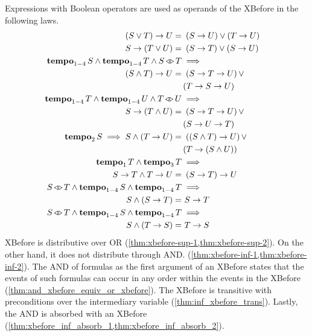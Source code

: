 Expressions with Boolean operators are used as operands of the \ac{XBefore} in the following laws.
%
\begin{subequations}
\label{thms:xbefore-boolean}
\begin{align}
\xbefore{\left(S \lor T\right)}{U} =&~
  \parsin{\xbefore{S}{U}} \lor \parsin{\xbefore{T}{U}} &
  \label{thm:xbefore-sup-1}\\
\xbefore{S}{\left(T \lor U\right)} =&~
  \parsin{\xbefore{S}{T}} \lor \parsin{\xbefore{S}{U}} &
  \label{thm:xbefore-sup-2}\\
\tempo{S} \land \tempo{T} \land \independentevents{S}{T} & \implies\nonumber \\
  \xbefore{\left(S \land T\right)}{U} =&~
  \parsin{\xbefore{\xbefore{S}{T}}{U}} \lor \nonumber\\
  &\parsin{\xbefore{\xbefore{T}{S}}{U}} &
  \label{thm:xbefore-inf-1}\\
\tempo{T} \land \tempo{U} \land \independentevents{T}{U} & \implies \nonumber\\
  \xbefore{S}{\left(T \land U\right)} =&~
  \parsin{\xbefore{S}{\xbefore{T}{U}}} \lor \nonumber\\
  &\parsin{\xbefore{S}{\xbefore{U}{T}}} &
  \label{thm:xbefore-inf-2}\\
\tempo[2]{S} \implies S \land \parsin{\xbefore{T}{U}} =&~
  \parsin{\xbefore{\parsin{S \land T}}{U}} \lor \nonumber\\
  &\parsin{\xbefore{T}{\parsin{S \land U}}} &
  \label{thm:and_xbefore_equiv_or_xbefore}\\
\tempo[1]{T} \land \tempo[3]{T} &\implies\nonumber\\
  \xbefore{S}{T} \land \xbefore{T}{U} =&~
  \xbefore{\left(\xbefore{S}{T}\right)}{U}
  & 
  \label{thm:inf_xbefore_trans}\\
\independentevents{S}{T} \land \tempo[1-4]{S} \land \tempo[1-4]{T} & \implies\nonumber\\
  S \land \left(\xbefore{S}{T}\right) =&~ \xbefore{S}{T}
  \label{thm:xbefore_inf_absorb_1}\\
\independentevents{S}{T} \land \tempo[1-4]{S} \land \tempo[1-4]{T} & \implies\nonumber\\
  S \land \left(\xbefore{T}{S}\right) =&~ \xbefore{T}{S}
  \label{thm:xbefore_inf_absorb_2}
\end{align}
\end{subequations}
%
\ac{XBefore} is distributive over \ac{OR} (\cref{thm:xbefore-sup-1,thm:xbefore-sup-2}).
On the other hand, it does not distribute through \ac{AND}. (\cref{thm:xbefore-inf-1,thm:xbefore-inf-2}).
The \ac{AND} of formulas as the first argument of an \ac{XBefore} states that the events of such formulas can occur in any order within the events in the \ac{XBefore} (\cref{thm:and_xbefore_equiv_or_xbefore}).
The \ac{XBefore} is transitive with preconditions over the intermediary variable (\cref{thm:inf_xbefore_trans}).
Lastly, the \ac{AND} is absorbed with an \ac{XBefore} (\cref{thm:xbefore_inf_absorb_1,thm:xbefore_inf_absorb_2}).

